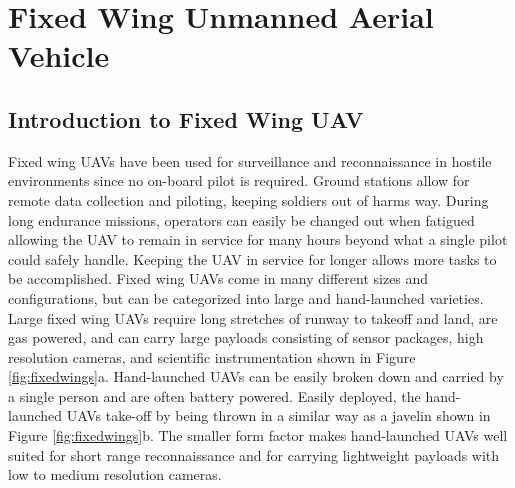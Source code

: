 \documentclass[numbered,pdftex]{ohio-etd}
\begin{document}
\section{Fixed Wing Unmanned Aerial Vehicle}
\subsection{Introduction to Fixed Wing UAV}

Fixed wing UAVs have been used for surveillance and reconnaissance in hostile environments since no on-board pilot is required. Ground stations allow for remote data collection and piloting, keeping soldiers out of harms way. During long endurance missions, operators can easily be changed out when fatigued allowing the UAV to remain in service for many hours beyond what a single pilot could safely handle. Keeping the UAV in service for longer allows more tasks to be accomplished. Fixed wing UAVs come in many different sizes and configurations, but can be categorized into large and hand-launched varieties. Large fixed wing UAVs require long stretches of runway to takeoff and land, are gas powered, and can carry large payloads consisting of sensor packages, high resolution cameras, and scientific instrumentation shown in Figure \ref{fig:fixedwings}a. Hand-launched UAVs can be easily broken down and carried by a single person and are often battery powered. Easily deployed, the hand-launched UAVs take-off by being thrown in a similar way as a javelin shown in Figure \ref{fig:fixedwings}b. The smaller form factor makes hand-launched UAVs well suited for short range reconnaissance and for carrying lightweight payloads with low to medium resolution cameras.
\end{document}
